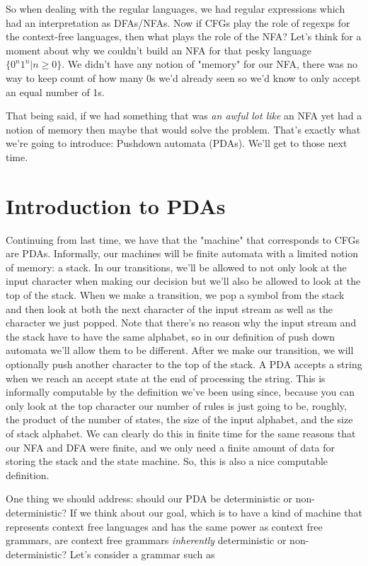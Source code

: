 \documentclass[11pt]{article}
\begin{document}
So when dealing with the regular languages, we had regular expressions which had an interpretation as DFAs/NFAs. Now if CFGs play the role of regexps for the context-free languages, then what plays the role of the NFA? Let's think for a moment about why we couldn't build an NFA for that pesky language  $\{0^n1^n | n \geq 0\}$. We didn't have any notion of "memory" for our NFA, there was no way to keep count of how many 0s we'd already seen so we'd know to only accept an equal number of 1s.

That being said, if we had something that was \emph{an awful lot like} an NFA yet had a notion of memory then maybe that would solve the problem. That's exactly what we're going to introduce: Pushdown automata (PDAs). We'll get to those next time.
\section{Introduction to PDAs}
\label{sec-7}
Continuing from last time, we have that the "machine" that corresponds to CFGs are PDAs. Informally, our machines will be finite automata with a limited notion of memory: a stack. In our transitions, we'll be allowed to not only look at the input character when making our decision but we'll also be allowed to look at the top of the stack. When we make a transition, we pop a symbol from the stack and then look at both the next character of the input stream as well as the character we just popped. Note that there's no reason why the input stream and the stack have to have the same alphabet, so in our definition of push down automata we'll allow them to be different. After we make our transition, we will optionally push another character to the top of the stack. A PDA accepts a string when we reach an accept state at the end of processing the string. This is informally computable by the definition we've been using since, because you can only look at the top character our number of rules is just going to be, roughly, the product of the number of states, the size of the input alphabet, and the size of stack alphabet. We can clearly do this in finite time for the same reasons that our NFA and DFA were finite, and we only need a finite amount of data for storing the stack and the state machine. So, this is also a nice computable definition.

One thing we should address: should our PDA be deterministic or non-deterministic? If we think about our goal, which is to have a kind of machine that represents context free languages and has the same power as context free grammars, are context free grammars \emph{inherently} deterministic or non-deterministic? Let's consider a grammar such as
\end{document}
